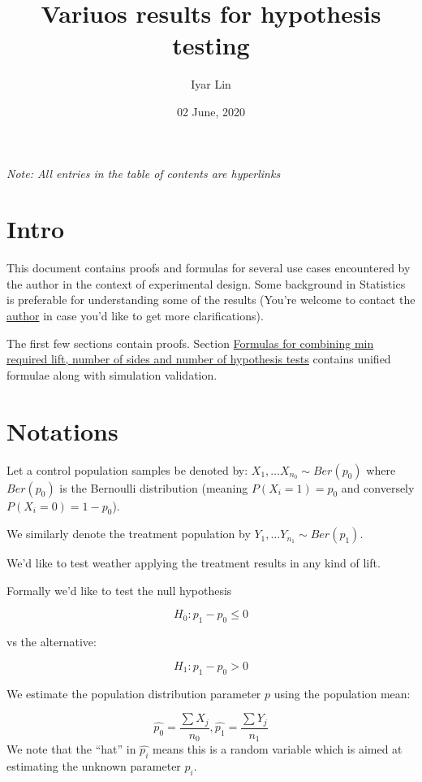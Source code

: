 \documentclass[
]{article}
\title{Variuos results for hypothesis testing}
\author{Iyar Lin}
\date{02 June, 2020}
\begin{document}
\maketitle

{
\setcounter{tocdepth}{3}
\tableofcontents
}
\emph{Note: All entries in the table of contents are hyperlinks}

\hypertarget{intro}{%
\section{Intro}\label{intro}}

This document contains proofs and formulas for several use cases
encountered by the author in the context of experimental design. Some
background in Statistics is preferable for understanding some of the
results (You're welcome to contact the
\href{mailto:iyarlin@gmail.com}{author} in case you'd like to get more
clarifications).

The first few sections contain proofs. Section
\protect\hyperlink{formulas}{Formulas for combining min required lift,
number of sides and number of hypothesis tests} contains unified
formulae along with simulation validation.

\hypertarget{notations}{%
\section{Notations}\label{notations}}

Let a control population samples be denoted by:
\(X_1, \dots X_{n_0} \sim Ber(p_0)\) where \(Ber(p_0)\) is the Bernoulli
distribution (meaning \(P(X_i = 1) = p_0\) and conversely
\(P(X_i = 0) = 1- p_0\)).

We similarly denote the treatment population by
\(Y_1, \dots Y_{n_1} \sim Ber(p_1)\).

We'd like to test weather applying the treatment results in any kind of
lift.

Formally we'd like to test the null hypothesis

\[H_0:p_1-p_0 \leq 0\]

vs the alternative:

\[H_1:p_1-p_0 > 0\]

We estimate the population distribution parameter \(p\) using the
population mean:

\[\hat{p_0} = \frac{\sum X_j}{n_0}, \hat{p_1} = \frac{\sum Y_j}{n_1}\]
We note that the ``hat'' in \(\hat{p_i}\) means this is a random
variable which is aimed at estimating the unknown parameter \(p_i\).
\end{document}
